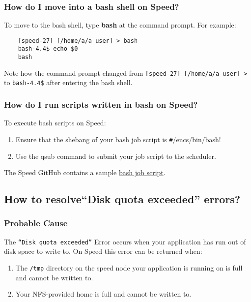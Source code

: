 \documentclass{easychair}
\begin{document}
\subsubsection{How do I move into a bash shell on Speed?}
To move to the bash shell, type \textbf{bash} at the command prompt.
For example:
\begin{verbatim}
	[speed-27] [/home/a/a_user] > bash
	bash-4.4$ echo $0
	bash
\end{verbatim}	

Note how the command prompt changed from \verb![speed-27] [/home/a/a_user] >! to \verb!bash-4.4$! after entering the bash shell.

\subsubsection{How do I run scripts written in bash on Speed?}
To execute bash scripts on Speed:
\begin{enumerate}
	\item 
Ensure that the shebang of your bash job script is \verb!#!/encs/bin/bash!
	\item 
Use the qsub command to submit your job script to the scheduler.
\end{enumerate}

The Speed GitHub contains a sample \href{https://github.com/NAG-DevOps/speed-hpc/blob/master/src/bash.sh}{bash job script}.  

\subsection{How to resolve``Disk quota exceeded'' errors?}

\subsubsection{Probable Cause}

The \texttt{``Disk quota exceeded''} Error occurs when your application has run out of disk space to write to. On Speed this error can be returned when:
\begin{enumerate}
	\item
The \texttt{/tmp} directory on the speed node your application is running on is full and cannot be written to.
	\item
Your NFS-provided home is full and cannot be written to.
\end{enumerate}
\end{document}
